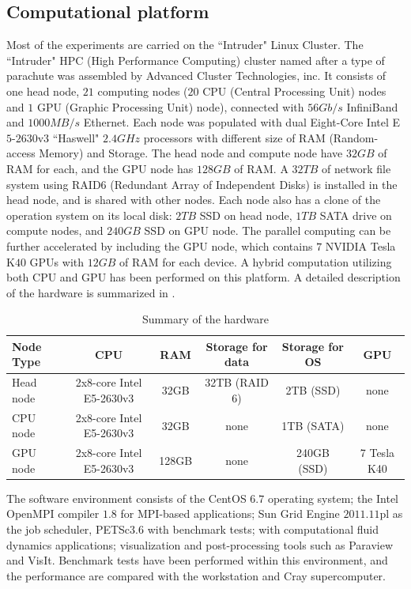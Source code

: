 \subsection{Computational platform}
Most of the experiments are carried on the ``Intruder" Linux Cluster.
The ``Intruder" HPC (High Performance Computing) cluster named after a type of
parachute was assembled by Advanced Cluster Technologies, inc. It consists of
one head node, $21$ computing nodes ($20$ CPU (Central Processing Unit) nodes
and $1$ GPU (Graphic Processing Unit) node), connected with $56Gb/s$ InfiniBand
and $1000MB/s$ Ethernet. Each node was populated with dual Eight-Core Intel
E$5$-$2630$v$3$ ``Haswell" $2.4GHz$ processors with different size of RAM
(Random-access Memory) and Storage. The head node and compute node have $32GB$
of RAM for each, and the GPU node has $128GB$ of RAM. A $32TB$ of network file
system using RAID6 (Redundant Array of Independent Disks) is installed in the
head node, and is shared with other nodes. Each node also has a clone of the
operation system on its local disk: $2TB$ SSD on head node, $1TB$ SATA drive on
compute nodes, and $240GB$ SSD on GPU node. The parallel computing can be
further accelerated by including the GPU node, which contains $7$ NVIDIA
Tesla K$40$ GPUs with $12GB$ of RAM for each device. A hybrid computation
utilizing both CPU and GPU has been performed on this platform. A detailed
description of the hardware is summarized in .

\begin{table}[!htbp]\center\resizebox{\textwidth}{!}
{
\begin{tabular}{l c c c c c}
\hline\hline
Node Type & CPU & RAM & Storage for data & Storage for OS & GPU\\
\hline
Head node 	 &  2x8-core Intel E5-2630v3 & 32GB  & 32TB (RAID 6)  &  2TB (SSD) & none\\
CPU node     &  2x8-core Intel E5-2630v3 & 32GB  & none  &  1TB (SATA) & none\\
GPU node 	 &  2x8-core Intel E5-2630v3 & 128GB & none  &  240GB (SSD) & 7 Tesla K40\\
\hline
\end{tabular}}
\caption{Summary of the hardware \label{hardware}}
\end{table}

The software environment consists of the CentOS $6.7$ operating system; the
Intel OpenMPI compiler $1.8$ for MPI-based applications; Sun Grid Engine
$2011.11$pl as the job scheduler, PETSc$3.6$ with benchmark tests; \FronTierp
with computational fluid dynamics applications; visualization and post-processing 
tools such as Paraview and VisIt.  Benchmark tests have been performed within 
this environment, and the performance are compared with the workstation and Cray supercomputer.

